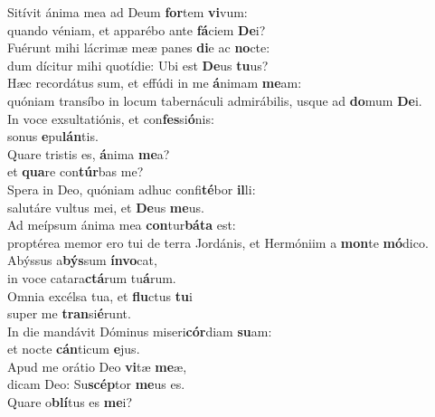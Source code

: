 \evenverse Sitívit ánima mea ad Deum \textbf{for}tem \textbf{vi}vum:~\*\\
\evenverse quando véniam, et apparébo ante \textbf{fá}ciem \textbf{De}i?\\
\oddverse Fuérunt mihi lácrimæ meæ panes \textbf{di}e ac \textbf{no}cte:~\*\\
\oddverse dum dícitur mihi quotídie: Ubi est \textbf{De}us \textbf{tu}us?\\
\evenverse Hæc recordátus sum, et effúdi in me \textbf{á}nimam \textbf{me}am:~\*\\
\evenverse quóniam transíbo in locum tabernáculi admirábilis, usque ad \textbf{do}mum \textbf{De}i.\\
\oddverse In voce exsultatiónis, et con\textbf{fes}si\textbf{ó}nis:~\*\\
\oddverse sonus \textbf{e}pu\textbf{lán}tis.\\
\evenverse Quare tristis es, \textbf{á}nima \textbf{me}a?~\*\\
\evenverse et \textbf{qua}re con\textbf{túr}bas me?\\
\oddverse Spera in Deo, quóniam adhuc confi\textbf{té}bor \textbf{il}li:~\*\\
\oddverse salutáre vultus mei, et \textbf{De}us \textbf{me}us.\\
\evenverse Ad meípsum ánima mea \textbf{con}tur\textbf{bá}\textbf{ta} est:~\*\\
\evenverse proptérea memor ero tui de terra Jordánis, et Hermóniim a \textbf{mon}te \textbf{mó}dico.\\
\oddverse Abýssus a\textbf{býs}sum \textbf{ín}\textbf{vo}cat,~\*\\
\oddverse in voce catara\textbf{ctá}rum tu\textbf{á}rum.\\
\evenverse Omnia excélsa tua, et \textbf{flu}ctus \textbf{tu}i~\*\\
\evenverse super me \textbf{tran}si\textbf{é}runt.\\
\oddverse In die mandávit Dóminus miseri\textbf{cór}diam \textbf{su}am:~\*\\
\oddverse et nocte \textbf{cán}ticum \textbf{e}jus.\\
\evenverse Apud me orátio Deo \textbf{vi}tæ \textbf{me}æ,~\*\\
\evenverse dicam Deo: Su\textbf{scép}tor \textbf{me}us es.\\
\oddverse Quare o\textbf{blí}tus es \textbf{me}i?~\*\\
